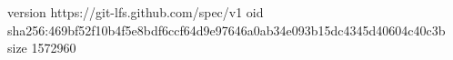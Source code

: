 version https://git-lfs.github.com/spec/v1
oid sha256:469bf52f10b4f5e8bdf6ccf64d9e97646a0ab34e093b15dc4345d40604c40c3b
size 1572960

